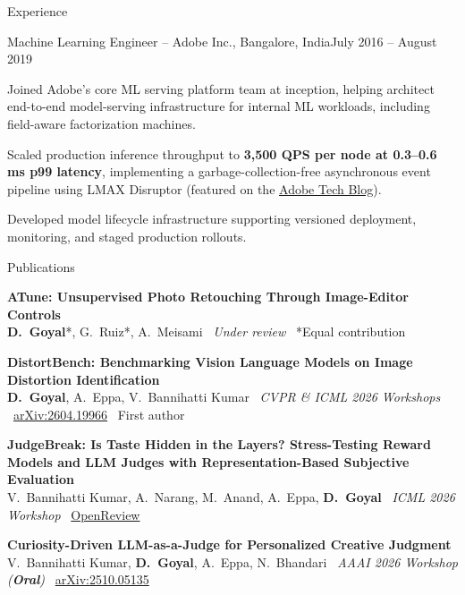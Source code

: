 \documentclass{resume}
\begin{document}
\begin{rSection}{Experience}
\begin{rSubsection}{Machine Learning Engineer {\mdseries -- Adobe Inc., Bangalore, India}}{July 2016 -- August 2019}{}{}
\item Joined Adobe's core ML serving platform team at inception, helping architect \mbox{end-to-end} \mbox{model-serving} infrastructure for internal ML workloads, including \mbox{field-aware} factorization machines.
\item Scaled production inference throughput to {\bf 3,500 QPS per node at 0.3--0.6 ms p99 latency}, implementing a \mbox{garbage-collection-free} asynchronous event pipeline using LMAX Disruptor (featured on the \href{https://medium.com/adobetech/engineering-high-throughput-low-latency-machine-learning-services-7d45edac0271}{Adobe Tech Blog}).
\item Developed model lifecycle infrastructure supporting versioned deployment, monitoring, and staged production rollouts.
\end{rSubsection}

\end{rSection}


\begin{rSection}{Publications}
\raggedright

\textbf{ATune: Unsupervised Photo Retouching Through Image-Editor Controls} \\
{\bf D.\ Goyal}*, G.\ Ruiz*, A.\ Meisami \textbar\ \textit{Under review} \textbar\ *Equal contribution

\vspace{0.45em}
\textbf{DistortBench: Benchmarking Vision Language Models on Image Distortion Identification} \\
{\bf D.\ Goyal}, A.\ Eppa, V.\ Bannihatti Kumar \textbar\ \textit{CVPR \& ICML 2026 Workshops} \textbar\ \href{https://arxiv.org/abs/2604.19966}{arXiv:2604.19966} \textbar\ First author

\vspace{0.45em}
\textbf{JudgeBreak: Is Taste Hidden in the Layers? Stress-Testing Reward Models and LLM Judges with Representation-Based Subjective Evaluation} \\
V.\ Bannihatti Kumar, A.\ Narang, M.\ Anand, A.\ Eppa, {\bf D.\ Goyal} \textbar\ \textit{ICML 2026 Workshop} \textbar\ \href{https://openreview.net/forum?id=5mnXwdpIRH}{OpenReview}

\vspace{0.45em}
\textbf{Curiosity-Driven LLM-as-a-Judge for Personalized Creative Judgment} \\
V.\ Bannihatti Kumar, {\bf D.\ Goyal}, A.\ Eppa, N.\ Bhandari \textbar\ \textit{AAAI 2026 Workshop (\textbf{Oral})} \textbar\ \href{https://arxiv.org/abs/2510.05135}{arXiv:2510.05135}

\end{rSection}
\end{document}
